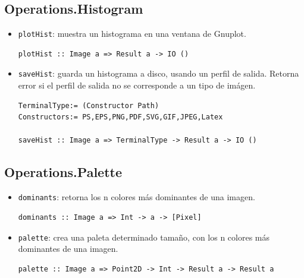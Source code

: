 \documentclass[a4paper, 11pt]{article} %
\begin{document}
\begin{itemize}
	\end{itemize}
	

\subsection*{Operations.Histogram}
	\begin{itemize} 
		\item \texttt{plotHist}: muestra un histograma en una ventana de Gnuplot.
\begin{lstlisting} 
plotHist :: Image a => Result a -> IO ()
\end{lstlisting}
		\item \texttt{saveHist}: guarda un histograma a disco, usando un perfil de salida. Retorna error si el perfil de salida no se corresponde a un tipo de imágen.
\begin{lstlisting}
TerminalType:= (Constructor Path)
Constructors:= PS,EPS,PNG,PDF,SVG,GIF,JPEG,Latex

saveHist :: Image a => TerminalType -> Result a -> IO ()
\end{lstlisting}
	\end{itemize}


\subsection*{Operations.Palette}
	\begin{itemize} 
		\item \texttt{dominants}: retorna los n colores más dominantes de una imagen.
\begin{lstlisting} 
dominants :: Image a => Int -> a -> [Pixel]
\end{lstlisting}
		\item \texttt{palette}: crea una paleta determinado tamaño, con los n colores más dominantes de una imagen.
\begin{lstlisting}
palette :: Image a => Point2D -> Int -> Result a -> Result a
\end{lstlisting}
	\end{itemize}
\end{document}
